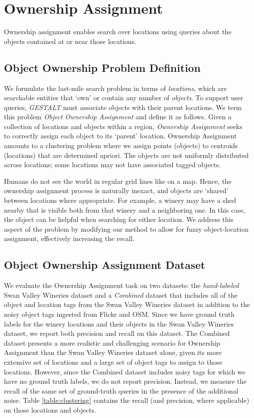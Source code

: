 \section{Ownership Assignment}
\label{section:ownership}

Ownership assignment enables search over locations using queries about the objects contained at or near those locations.

\subsection{Object Ownership Problem Definition}

We formulate the last-mile search problem in terms of \textit{locations}, which are searchable entities that `own' or contain any number of \textit{objects}. 
To support user queries, \emph{GESTALT} must associate objects with their parent locations.
We term this problem \textit{Object Ownership Assignment} and define it as follows.
Given a collection of locations and objects within a region, \emph{Ownership Assignment} seeks to correctly assign each object to its `parent' location. 
Ownership Assignment amounts to a clustering problem where we assign points (objects) to centroids (locations) that are determined apriori. 
The objects are not uniformly distributed across locations; some locations may not have associated tagged objects. 

Humans do not see the world in regular grid lines like on a map. Hence, the ownership assignment process is naturally inexact, and objects are `shared' between locations where appropriate.
For example, a winery may have a shed nearby that is visible both from that winery and a neighboring one. 
In this case, the object can be helpful when searching for either location. 
We address this aspect of the problem by modifying our method to allow for fuzzy object-location assignment, effectively increasing the recall. 

\subsection{Object Ownership Assignment Dataset}

We evaluate the Ownership Assignment task on two datasets: the \textit{hand-labeled} Swan Valley Wineries dataset and a \textit{Combined} dataset that includes all of the object and location tags from the Swan Valley Wineries dataset in addition to the noisy object tags ingested from Flickr and OSM.
Since we have ground truth labels for the winery locations and their objects in the Swan Valley Wineries dataset, we report both precision and recall on this dataset.
The Combined dataset presents a more realistic and challenging scenario for Ownership Assignment than the Swan Valley Wineries dataset alone, given its more extensive set of locations and a large set of object tags to assign to those locations. 
However, since the Combined dataset includes noisy tags for which we have no ground truth labels, we do not report precision. 
Instead, we measure the recall of the same set of ground-truth queries in the presence of the additional noise. 
Table \ref{table:clustering} contains the recall (and precision, where applicable) on those locations and objects.

